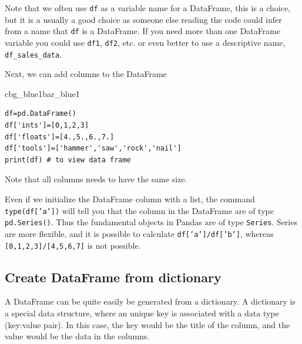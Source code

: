 \documentclass[%
oneside,                 %
final,                   %
10pt]{article}
\newenvironment{_pro_tight}[2]{
   \def\FrameCommand{\color{#2}\vrule width 1mm\normalcolor\colorbox{#1}}
   \FrameRule0.6pt\MakeFramed {\advance\hsize-2mm\FrameRestore}\vskip3mm}
   {\vskip0mm\endMakeFramed}
\newenvironment{pro}[2]{
\bgroup\rmfamily
\fboxsep=0mm\relax
\begin{_pro_tight}{#1}{#2}
\list{}{\parsep=-2mm\parskip=0mm\topsep=0pt\leftmargin=2mm
\rightmargin=2\leftmargin\leftmargin=4pt\relax}
\item\relax}
{\endlist\end{_pro_tight}\egroup}
\newenvironment{notice_mdfboxadmon}[1][]{
\begin{notice_mdfboxmdframed}[frametitle=#1]
}
{
\end{notice_mdfboxmdframed}
}
\begin{document}
\begin{notice_mdfboxadmon}
Note that we often use \texttt{df} as a variable name for a DataFrame, this is a choice, but it is a usually a good choice as someone else reading the code could infer from a name that \texttt{df} is a DataFrame. If you need more than one DataFrame variable you could use \texttt{df1}, \texttt{df2}, etc. or even better to use a descriptive name, \Verb!df_sales_data!.
\end{notice_mdfboxadmon} %


Next, we can add columns to the DataFrame






\begin{pro}{cbg_blue1}{bar_blue1}\begin{Verbatim}[numbers=none,fontsize=\fontsize{9pt}{9pt},baselinestretch=0.95,xleftmargin=2mm]
df=pd.DataFrame()
df['ints']=[0,1,2,3]
df['floats']=[4.,5.,6.,7.]
df['tools']=['hammer','saw','rock','nail']
print(df) # to view data frame

\end{Verbatim}
\end{pro}
\noindent

Note that all columns needs to have the same size.


\begin{notice_mdfboxadmon}
Even if we initialize the DataFrame column with a list, the command \texttt{type(df['a'])} will tell you that the column in the DataFrame are of type \texttt{pd.Series()}. Thus the fundamental objects in Pandas are of type \texttt{Series}. Series are more flexible, and it is possible to calculate \texttt{df['a']/df['b']}, whereas \texttt{[0,1,2,3]/[4,5,6,7]} is not possible.
\end{notice_mdfboxadmon} %



\subsection{Create DataFrame from dictionary}
A DataFrame can be quite easily be generated from a dictionary. A dictionary is a special data structure, where an unique key is associated with a data type (key:value pair). In this case, the key would be the title of the column, and the value would be the data in the columns.
\end{document}
